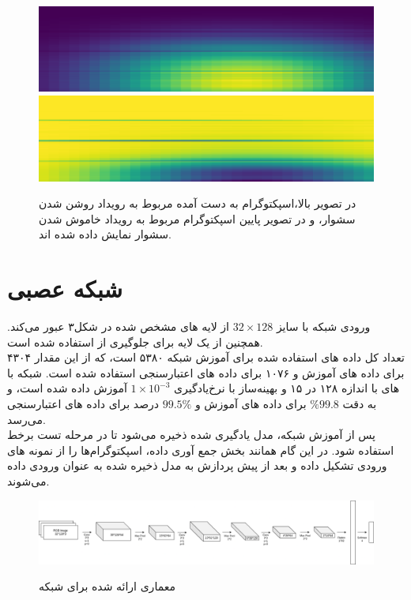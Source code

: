 \documentclass[12pt,onecolumn,a4paper]{article}
\begin{document}
\begin{figure}
	\centering
	\includegraphics[totalheight=3cm]{Images/2.png}\\
	\vspace{5pt}
	\includegraphics[totalheight=3cm]{Images/3.png}
	\caption{در تصویر بالا،اسپکتوگرام به دست آمده مربوط به رویداد روشن شدن سشوار، و در تصویر پایین اسپکتوگرام مربوط به رویداد خاموش شدن سشوار نمایش داده شده اند. }
	\label{fig:data}
\end{figure}

\section{شبکه عصبی}

ورودی شبکه با سایز 
$32 \times 128$
از لایه های مشخص شده در شکل۳ عبور می‌کند. همچنین از یک لایه 
برای جلوگیری از 
استفاده شده است.\\
تعداد کل داده های استفاده شده برای آموزش شبکه ۵۳۸۰ است، که از این مقدار ۴۳۰۴ برای داده های آموزش و ۱۰۷۶ برای داده های اعتبارسنجی استفاده شده است. شبکه با  های با اندازه ۱۲۸ در ۱۵  و بهینه‌ساز 
با نرخ‌یادگیری $1 \times 10^{-3}$ 
آموزش داده شده است، و به دقت $\%99.8$ برای داده های آموزش و $99.5\%$ درصد برای داده های اعتبارسنجی می‌رسد.\\
پس از آموزش شبکه، مدل یادگیری شده ذخیره می‌شود تا در مرحله تست برخط استفاده شود. در این گام همانند بخش جمع آوری داده، اسپکتوگرام‌ها را از نمونه های ورودی تشکیل داده و بعد از پیش پردازش به مدل ذخیره شده به عنوان ورودی داده می‌شوند.

\begin{figure}
	\centering
	\includegraphics[totalheight=2.7cm]{Images/4.png}\\
	\vspace{5pt}
	\caption{معماری ارائه شده برای شبکه}
	\label{fig:data}
\end{figure}
\end{document}
